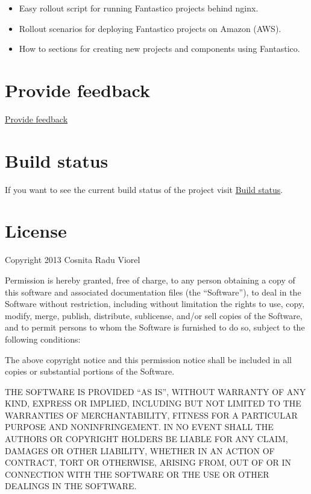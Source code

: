 \documentclass[letterpaper,10pt,english]{sphinxmanual}
\begin{document}
\begin{itemize}
\begin{description}
\begin{itemize}
\item {} 
Easy rollout script for running Fantastico projects behind nginx.

\item {} 
Rollout scenarios for deploying Fantastico projects on Amazon (AWS).

\item {} 
How to sections for creating new projects and components using Fantastico.

\end{itemize}

\end{description}

\end{itemize}


\chapter{Provide feedback}
\label{index:provide-feedback}
\href{https://docs.google.com/forms/d/1tKBopU3lfDB\_w8F4h7Rl1Rn4uydAJq-nha09L\_ptJck/edit?usp=sharing}{Provide feedback}


\chapter{Build status}
\label{index:build-status}
If you want to see the current build status of the project visit \href{http://jenkins.scrum-expert.ro:8080/job/fantastico-framework/badge/icon/}{Build status}.


\chapter{License}
\label{index:license}
Copyright 2013 Cosnita Radu Viorel

Permission is hereby granted, free of charge, to any person obtaining a copy of this software and associated
documentation files (the ``Software''), to deal in the Software without restriction, including without limitation
the rights to use, copy, modify, merge, publish, distribute, sublicense, and/or sell copies of the Software,
and to permit persons to whom the Software is furnished to do so, subject to the following conditions:

The above copyright notice and this permission notice shall be included in all copies or substantial portions of the Software.

THE SOFTWARE IS PROVIDED ``AS IS'', WITHOUT WARRANTY OF ANY KIND, EXPRESS OR IMPLIED, INCLUDING BUT NOT LIMITED TO THE
WARRANTIES OF MERCHANTABILITY, FITNESS FOR A PARTICULAR PURPOSE AND NONINFRINGEMENT. IN NO EVENT SHALL THE AUTHORS OR
COPYRIGHT HOLDERS BE LIABLE FOR ANY CLAIM, DAMAGES OR OTHER LIABILITY, WHETHER IN AN ACTION OF CONTRACT, TORT OR OTHERWISE,
ARISING FROM, OUT OF OR IN CONNECTION WITH THE SOFTWARE OR THE USE OR OTHER DEALINGS IN THE SOFTWARE.



\renewcommand{\indexname}{Index}
\printindex
\end{document}
